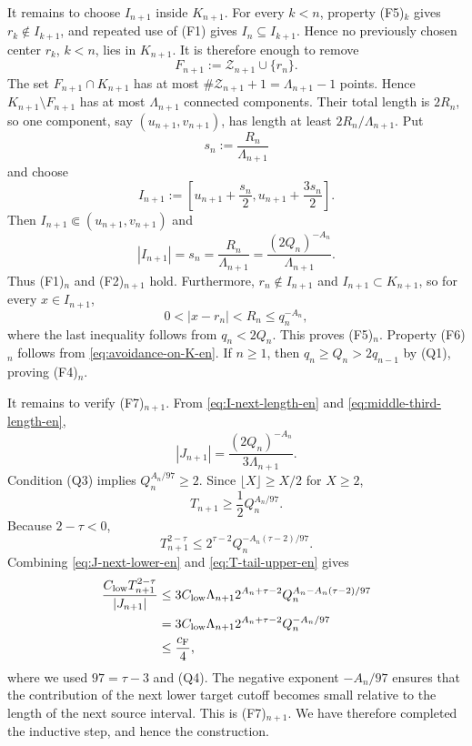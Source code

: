 \documentclass[11pt]{amsart}
\numberwithin{equation}{section}
\theoremstyle{definition}
\theoremstyle{remark}
\newcommand{\abs}[1]{\left\lvert #1\right\rvert}
\begin{document}
It remains to choose $I_{n+1}$ inside $K_{n+1}$. For every $k<n$,
property \textup{(F5)}$_k$ gives
$r_k\notin I_{k+1}$, and repeated use of \textup{(F1)} gives
$I_n\subseteq I_{k+1}$. Hence no previously chosen center $r_k$,
$k<n$, lies in $K_{n+1}$. It is therefore enough to remove
\begin{equation}\label{eq:forbidden-next-en}
F_{n+1}:=\mathcal Z_{n+1}\cup\{r_n\}.
\end{equation}
The set $F_{n+1}\cap K_{n+1}$ has at most
$\#\mathcal Z_{n+1}+1=\Lambda_{n+1}-1$ points. Hence
$K_{n+1}\setminus F_{n+1}$ has at most $\Lambda_{n+1}$ connected
components. Their total length is $2R_n$, so one component, say
$(u_{n+1},v_{n+1})$, has length at least
$2R_n/\Lambda_{n+1}$. Put
\[
s_n:=\frac{R_n}{\Lambda_{n+1}}
\]
and choose
\begin{equation}\label{eq:I-next-choice-en}
I_{n+1}
:=
\left[
 u_{n+1}+\frac{s_n}{2},
 u_{n+1}+\frac{3s_n}{2}
\right].
\end{equation}
Then $I_{n+1}\Subset(u_{n+1},v_{n+1})$ and
\begin{equation}\label{eq:I-next-length-en}
|I_{n+1}|
=s_n
=\frac{R_n}{\Lambda_{n+1}}
=\frac{(2Q_n)^{-A_n}}{\Lambda_{n+1}}.
\end{equation}
Thus \textup{(F1)}$_n$ and \textup{(F2)}$_{n+1}$ hold.
Furthermore, $r_n\notin I_{n+1}$ and
$I_{n+1}\subset K_{n+1}$, so for every $x\in I_{n+1}$,
\[
0<\abs{x-r_n}<R_n\leq q_n^{-A_n},
\]
where the last inequality follows from $q_n<2Q_n$. This proves
\textup{(F5)}$_n$. Property \textup{(F6)}$_n$ follows from
\eqref{eq:avoidance-on-K-en}. If $n\geq1$, then
$q_n\geq Q_n>2q_{n-1}$ by \textup{(Q1)}, proving
\textup{(F4)}$_n$.

It remains to verify \textup{(F7)}$_{n+1}$. From
\eqref{eq:I-next-length-en} and
\eqref{eq:middle-third-length-en},
\begin{equation}\label{eq:J-next-lower-en}
|J_{n+1}|
=\frac{(2Q_n)^{-A_n}}{3\Lambda_{n+1}}.
\end{equation}
Condition \textup{(Q3)} implies $Q_n^{A_n/97}\geq2$. Since
$\lfloor X\rfloor\geq X/2$ for $X\geq2$,
\[
T_{n+1}\geq\frac12Q_n^{A_n/97}.
\]
Because $2-\tau<0$,
\begin{equation}\label{eq:T-tail-upper-en}
T_{n+1}^{2-\tau}
\leq
2^{\tau-2}Q_n^{-A_n(\tau-2)/97}.
\end{equation}
Combining \eqref{eq:J-next-lower-en} and \eqref{eq:T-tail-upper-en} gives
\begin{align}
\frac{C_{\mathrm{low}}T_{n+1}^{2-\tau}}{|J_{n+1}|}
&\leq
3C_{\mathrm{low}}\Lambda_{n+1}
2^{A_n+\tau-2}
Q_n^{A_n-A_n(\tau-2)/97}\notag\\
&=
3C_{\mathrm{low}}\Lambda_{n+1}
2^{A_n+\tau-2}Q_n^{-A_n/97}\notag\\
&\leq\frac{c_{\mathrm F}}4,
\label{eq:tail-ratio-next-en}
\end{align}
where we used $97=\tau-3$ and \textup{(Q4)}. The negative exponent $-A_n/97$ ensures that the contribution
of the next lower target cutoff becomes small relative to the
length of the next source interval. This is
\textup{(F7)}$_{n+1}$. We have therefore completed the inductive step,
and hence the construction.
\end{document}
